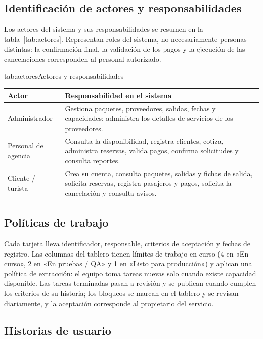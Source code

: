 \subsection{Identificación de actores y responsabilidades}

Los actores del sistema y sus responsabilidades se resumen en la
tabla~\ref{tab:actores}. Representan roles del sistema, no necesariamente
personas distintas: la confirmación final, la validación de los pagos y la
ejecución de las cancelaciones corresponden al personal autorizado.

\begin{tablaapa}{tab:actores}{Actores y responsabilidades}
\small
\begin{tabular}{@{}p{3.6cm}p{11cm}@{}}
\toprule
Actor & Responsabilidad en el sistema \\
\midrule
Administrador & Gestiona paquetes, proveedores, salidas, fechas y
capacidades; administra los detalles de servicios de los proveedores. \\
Personal de agencia & Consulta la disponibilidad, registra clientes,
cotiza, administra reservas, valida pagos, confirma solicitudes y consulta
reportes. \\
Cliente / turista & Crea su cuenta, consulta paquetes, salidas y fichas de
salida, solicita reservas, registra pasajeros y pagos, solicita la
cancelación y consulta avisos. \\
\bottomrule
\end{tabular}
\end{tablaapa}

\subsection{Políticas de trabajo}

Cada tarjeta lleva identificador, responsable, criterios de aceptación y
fechas de registro. Las columnas del tablero tienen límites de trabajo en
curso (4 en «En curso», 2 en «En pruebas / QA» y 1 en «Listo para
producción») y aplican una política de extracción: el equipo toma tareas
nuevas solo cuando existe capacidad disponible. Las tareas terminadas pasan a
revisión y se publican cuando cumplen los criterios de su historia; los
bloqueos se marcan en el tablero y se revisan diariamente, y la aceptación
corresponde al propietario del servicio.

\subsection{Historias de usuario}

